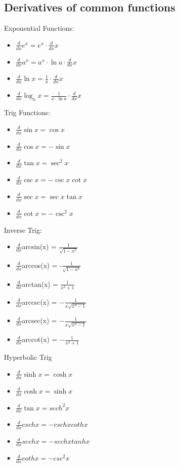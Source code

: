 \documentclass{report}
\begin{document}
    \subsection{Derivatives of common functions}
    \bigbreak \noindent 
    Exponential Functions:
    \begin{itemize}
      \item $\frac{d}{dx}e^{x} = e^{x} \cdot \frac{d}{dx}x$
      \item $\frac{d}{dx}a^{x} = a^{x} \cdot \ln{a} \cdot \frac{d}{dx}x$
      \item $\frac{d}{dx}\ln{x}  = \frac{1}{x} \cdot \frac{d}{dx}x$
      \item $\frac{d}{dx}\log_a{x} = \frac{1}{x \cdot \ln{a}} \cdot \frac{d}{dx}x$
    \end{itemize}
    \bigbreak \noindent \bigbreak \noindent
    Trig Functions:
    \begin{itemize}
      \item $\frac{d}{dx}\sin{x}  = \cos{x}$
      \item $\frac{d}{dx}\cos{x}  = -\sin{x}$
      \item $\frac{d}{dx}\tan{x} = \sec^{2}{x} $
      \item $\frac{d}{dx}\csc{x} = -\csc{x}\cot{x} $
      \item $\frac{d}{dx}\sec{x} = \sec{x}\tan{x} $
      \item $\frac{d}{dx}\cot{x} = -\csc^{2}{x} $
    \end{itemize}
    \bigbreak \noindent \bigbreak \noindent
    Inverse Trig:
    \begin{itemize}
      \item $\frac{d}{dx}$arcsin(x) = $\frac{1}{\sqrt{1-x^{2}}}$
      \item $\frac{d}{dx}$arccos(x) = -$\frac{1}{\sqrt{1-x^{2}}}$
      \item $\frac{d}{dx}$arctan(x) = $\frac{1}{x^{2}+1}$
      \item $\frac{d}{dx}$arccsc(x) = $-\frac{1}{x\sqrt{x^{2}-1}}$
      \item $\frac{d}{dx}$arcsec(x) = $-\frac{1}{x\sqrt{x^{2}-1}}$
      \item $\frac{d}{dx}$arccot(x) = $-\frac{1}{x^{2}+1}$
    \end{itemize}

    \pagebreak \bigbreak \noindent
    \bigbreak \noindent \bigbreak \noindent
    Hyperbolic Trig
    \begin{itemize}
      \item $\frac{d}{dx}\sinh{x}  = \cosh{x}$
      \item $\frac{d}{dx}\cosh{x} = \sinh{x}$
      \item $\frac{d}{dx}\tan{x} = sech^{2}x$
      \item $\frac{d}{dx}csch{x} = -csch{x}cothx$
      \item $\frac{d}{dx}sech{x} = -sechxtanhx$
      \item $\frac{d}{dx}coth{x} = -csc^{2}x$
    \end{itemize}
\end{document}
